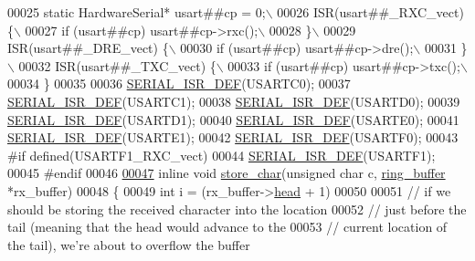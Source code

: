 \begin{DoxyCode}
00025 \textcolor{preprocessor}{static HardwareSerial*  usart##cp = 0;\(\backslash\)}
00026 \textcolor{preprocessor}{ISR(usart##\_RXC\_vect) \{\(\backslash\)}
00027 \textcolor{preprocessor}{    if (usart##cp) usart##cp->rxc();\(\backslash\)}
00028 \textcolor{preprocessor}{\}\(\backslash\)}
00029 \textcolor{preprocessor}{ISR(usart##\_DRE\_vect) \{\(\backslash\)}
00030 \textcolor{preprocessor}{    if (usart##cp) usart##cp->dre();\(\backslash\)}
00031 \textcolor{preprocessor}{\}\(\backslash\)}
00032 \textcolor{preprocessor}{ISR(usart##\_TXC\_vect) \{\(\backslash\)}
00033 \textcolor{preprocessor}{    if (usart##cp) usart##cp->txc();\(\backslash\)}
00034 \textcolor{preprocessor}{\}}
00035 \textcolor{preprocessor}{}
00036 \hyperlink{_hardware_serial_8cpp_a16a017d9862dd0b2fae7c5fd9d80780f}{SERIAL_ISR_DEF}(USARTC0);
00037 \hyperlink{_hardware_serial_8cpp_a16a017d9862dd0b2fae7c5fd9d80780f}{SERIAL_ISR_DEF}(USARTC1);
00038 \hyperlink{_hardware_serial_8cpp_a16a017d9862dd0b2fae7c5fd9d80780f}{SERIAL_ISR_DEF}(USARTD0);
00039 \hyperlink{_hardware_serial_8cpp_a16a017d9862dd0b2fae7c5fd9d80780f}{SERIAL_ISR_DEF}(USARTD1);
00040 \hyperlink{_hardware_serial_8cpp_a16a017d9862dd0b2fae7c5fd9d80780f}{SERIAL_ISR_DEF}(USARTE0);
00041 \hyperlink{_hardware_serial_8cpp_a16a017d9862dd0b2fae7c5fd9d80780f}{SERIAL_ISR_DEF}(USARTE1);
00042 \hyperlink{_hardware_serial_8cpp_a16a017d9862dd0b2fae7c5fd9d80780f}{SERIAL_ISR_DEF}(USARTF0);
00043 \textcolor{preprocessor}{#if defined(USARTF1\_RXC\_vect)}
00044 \textcolor{preprocessor}{}\hyperlink{_hardware_serial_8cpp_a16a017d9862dd0b2fae7c5fd9d80780f}{SERIAL_ISR_DEF}(USARTF1);
00045 \textcolor{preprocessor}{#endif}
00046 \textcolor{preprocessor}{}
\hypertarget{_hardware_serial_8cpp_source_l00047}{}\hyperlink{_hardware_serial_8cpp_ac661d0ebc0efa48a2b2aed9ccf86aa64}{00047} \textcolor{keyword}{inline} \textcolor{keywordtype}{void} \hyperlink{_hardware_serial_8cpp_ac661d0ebc0efa48a2b2aed9ccf86aa64}{store_char}(\textcolor{keywordtype}{unsigned} \textcolor{keywordtype}{char} c, \hyperlink{structring__buffer}{ring_buffer} *rx\_buffer)
00048 \{
00049     \textcolor{keywordtype}{int} i = (rx\_buffer->\hyperlink{structring__buffer_ac1b620f2e27c3af75e68bd1645a2f5f0}{head} + 1) %
00050     
00051     \textcolor{comment}{// if we should be storing the received character into the location}
00052     \textcolor{comment}{// just before the tail (meaning that the head would advance to the}
00053     \textcolor{comment}{// current location of the tail), we're about to overflow the buffer}

\end{DoxyCode}
